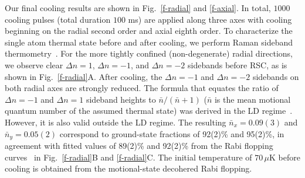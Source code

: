 \documentclass[aps,prl,twocolumn,groupedaddress]{revtex4-1}
\begin{document}
Our final cooling results are shown in Fig.~\ref{f-radial} and \ref{f-axial}.
In total, $1000$ cooling pulses (total duration $100$ ms) are applied
along three axes with cooling beginning on the radial second order and axial eighth order.
To characterize the single atom thermal state before and after cooling,
we perform Raman sideband thermometry~\cite{Monroe1995, Meekhof1996}.
For the more tightly confined (non-degenerate) radial directions,
we observe clear $\Delta n=1$, $\Delta n=-1$, and $\Delta n=-2$ sidebands before RSC, as is shown in Fig.~\ref{f-radial}A.
After cooling, the $\Delta n=-1$ and $\Delta n=-2$ sidebands on both radial axes are strongly reduced.
The formula that equates the ratio of $\Delta n=-1$ and $\Delta n=1$ sideband heights to $\bar{n}/(\bar{n}+1)$ ($\bar{n}$ is the mean motional quantum number of the assumed thermal state) was  derived in the LD regime~\cite{Monroe1995}. However, it is also valid outside the LD regime.  The resulting $\bar{n}_x=0.09(3)$ and $\bar{n}_y=0.05(2)$ correspond to ground-state fractions of 92(2)\% and 95(2)\%,  in agreement with fitted values of 89(2)\% and 92(2)\% from the Rabi flopping curves~ \cite{Meekhof1996} in Fig.~\ref{f-radial}B and \ref{f-radial}C.  
The initial temperature of $70\,\mu$K before cooling is obtained 
from the motional-state decohered Rabi flopping.
\end{document}
